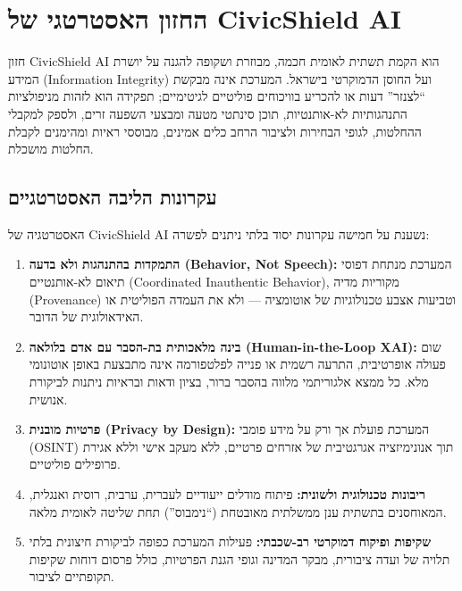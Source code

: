\section{החזון האסטרטגי של \textenglish{CivicShield AI}}
\label{sec:strategic_vision}

חזון \textenglish{CivicShield AI} הוא הקמת תשתית לאומית חכמה, מבוזרת ושקופה להגנה על יושרת המידע (\textenglish{Information Integrity}) ועל החוסן הדמוקרטי בישראל. המערכת אינה מבקשת ``לצנזר'' דעות או להכריע בוויכוחים פוליטיים לגיטימיים; תפקידה הוא לזהות מניפולציות התנהגותיות לא-אותנטיות, תוכן סינתטי מטעה ומבצעי השפעה זרים, ולספק למקבלי ההחלטות, לגופי הבחירות ולציבור הרחב כלים אמינים, מבוססי ראיות ומהימנים לקבלת החלטות מושכלת.

\subsection{עקרונות הליבה האסטרטגיים}

האסטרטגיה של \textenglish{CivicShield AI} נשענת על חמישה עקרונות יסוד בלתי ניתנים לפשרה:

\begin{enumerate}
    \item \textbf{התמקדות בהתנהגות ולא בדעה (\textenglish{Behavior, Not Speech}):} המערכת מנתחת דפוסי תיאום לא-אותנטיים (\textenglish{Coordinated Inauthentic Behavior}), מקוריות מדיה (\textenglish{Provenance}) וטביעות אצבע טכנולוגיות של אוטומציה --- ולא את העמדה הפוליטית או האידאולוגית של הדובר.
    \item \textbf{בינה מלאכותית בת-הסבר עם אדם בלולאה (\textenglish{Human-in-the-Loop XAI}):} שום פעולה אופרטיבית, התרעה רשמית או פנייה לפלטפורמה אינה מתבצעת באופן אוטונומי מלא. כל ממצא אלגוריתמי מלווה בהסבר ברור, בציון ודאות ובראיות ניתנות לביקורת אנושית.
    \item \textbf{פרטיות מובנית (\textenglish{Privacy by Design}):} המערכת פועלת אך ורק על מידע פומבי (\textenglish{OSINT}) תוך אנונימיזציה אגרגטיבית של אזרחים פרטיים, ללא מעקב אישי וללא אגירת פרופילים פוליטיים.
    \item \textbf{ריבונות טכנולוגית ולשונית:} פיתוח מודלים ייעודיים לעברית, ערבית, רוסית ואנגלית, המאוחסנים בתשתית ענן ממשלתית מאובטחת (``נימבוס'') תחת שליטה לאומית מלאה.
    \item \textbf{שקיפות ופיקוח דמוקרטי רב-שכבתי:} פעילות המערכת כפופה לביקורת חיצונית בלתי תלויה של ועדה ציבורית, מבקר המדינה וגופי הגנת הפרטיות, כולל פרסום דוחות שקיפות תקופתיים לציבור.
\end{enumerate}

